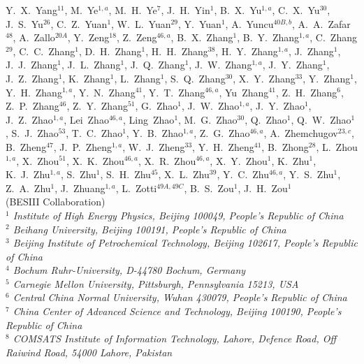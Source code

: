 {\begin{small}
\begin{center}
Y.~X.~Yang$^{11}$, M.~Ye$^{1,a}$, M.~H.~Ye$^{7}$, J.~H.~Yin$^{1}$, B.~X.~Yu$^{1,a}$, C.~X.~Yu$^{30}$, J.~S.~Yu$^{26}$, C.~Z.~Yuan$^{1}$, W.~L.~Yuan$^{29}$, Y.~Yuan$^{1}$, A.~Yuncu$^{40B,b}$, A.~A.~Zafar$^{48}$, A.~Zallo$^{20A}$, Y.~Zeng$^{18}$, Z.~Zeng$^{46,a}$, B.~X.~Zhang$^{1}$, B.~Y.~Zhang$^{1,a}$, C.~Zhang$^{29}$, C.~C.~Zhang$^{1}$, D.~H.~Zhang$^{1}$, H.~H.~Zhang$^{38}$, H.~Y.~Zhang$^{1,a}$, J.~Zhang$^{1}$, J.~J.~Zhang$^{1}$, J.~L.~Zhang$^{1}$, J.~Q.~Zhang$^{1}$, J.~W.~Zhang$^{1,a}$, J.~Y.~Zhang$^{1}$, J.~Z.~Zhang$^{1}$, K.~Zhang$^{1}$, L.~Zhang$^{1}$, S.~Q.~Zhang$^{30}$, X.~Y.~Zhang$^{33}$, Y.~Zhang$^{1}$, Y.~H.~Zhang$^{1,a}$, Y.~N.~Zhang$^{41}$, Y.~T.~Zhang$^{46,a}$, Yu~Zhang$^{41}$, Z.~H.~Zhang$^{6}$, Z.~P.~Zhang$^{46}$, Z.~Y.~Zhang$^{51}$, G.~Zhao$^{1}$, J.~W.~Zhao$^{1,a}$, J.~Y.~Zhao$^{1}$, J.~Z.~Zhao$^{1,a}$, Lei~Zhao$^{46,a}$, Ling~Zhao$^{1}$, M.~G.~Zhao$^{30}$, Q.~Zhao$^{1}$, Q.~W.~Zhao$^{1}$, S.~J.~Zhao$^{53}$, T.~C.~Zhao$^{1}$, Y.~B.~Zhao$^{1,a}$, Z.~G.~Zhao$^{46,a}$, A.~Zhemchugov$^{23,c}$, B.~Zheng$^{47}$, J.~P.~Zheng$^{1,a}$, W.~J.~Zheng$^{33}$, Y.~H.~Zheng$^{41}$, B.~Zhong$^{28}$, L.~Zhou$^{1,a}$, X.~Zhou$^{51}$, X.~K.~Zhou$^{46,a}$, X.~R.~Zhou$^{46,a}$, X.~Y.~Zhou$^{1}$, K.~Zhu$^{1}$, K.~J.~Zhu$^{1,a}$, S.~Zhu$^{1}$, S.~H.~Zhu$^{45}$, X.~L.~Zhu$^{39}$, Y.~C.~Zhu$^{46,a}$, Y.~S.~Zhu$^{1}$, Z.~A.~Zhu$^{1}$, J.~Zhuang$^{1,a}$, L.~Zotti$^{49A,49C}$, B.~S.~Zou$^{1}$, J.~H.~Zou$^{1}$
\\
\vspace{0.2cm}
(BESIII Collaboration)\\
\vspace{0.2cm} {\it
$^{1}$ Institute of High Energy Physics, Beijing 100049, People's Republic of China\\
$^{2}$ Beihang University, Beijing 100191, People's Republic of China\\
$^{3}$ Beijing Institute of Petrochemical Technology, Beijing 102617, People's Republic of China\\
$^{4}$ Bochum Ruhr-University, D-44780 Bochum, Germany\\
$^{5}$ Carnegie Mellon University, Pittsburgh, Pennsylvania 15213, USA\\
$^{6}$ Central China Normal University, Wuhan 430079, People's Republic of China\\
$^{7}$ China Center of Advanced Science and Technology, Beijing 100190, People's Republic of China\\
$^{8}$ COMSATS Institute of Information Technology, Lahore, Defence Road, Off Raiwind Road, 54000 Lahore, Pakistan\\
}
\end{center}
\end{small}}
